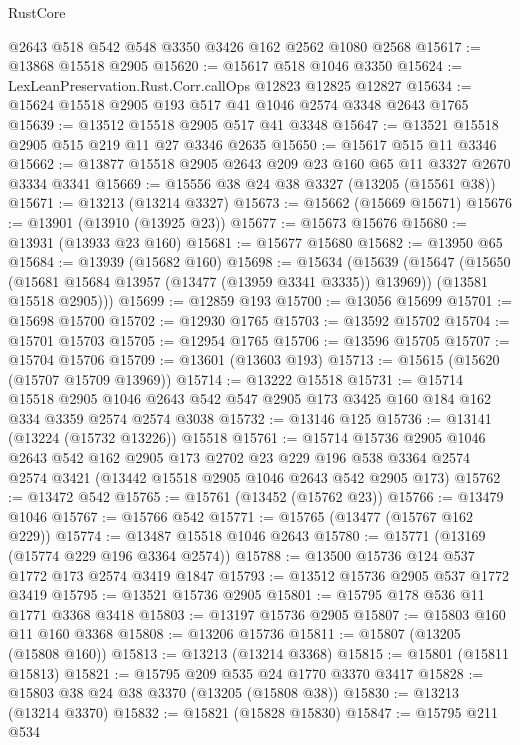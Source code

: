 \begin{lexlean}{RustCore}
\begin{coremodule}
    @2643
    @518
    @542
    @548
    @3350
    @3426
    @162
    @2562
    @1080
    @2568
@15617 := @13868 @15518 @2905
@15620 := @15617 @518 @1046 @3350
@15624 := LexLeanPreservation.Rust.Corr.callOps @12823 @12825 @12827
@15634 := @15624 @15518 @2905 @193 @517 @41 @1046 @2574 @3348 @2643 @1765
@15639 := @13512 @15518 @2905 @517 @41 @3348
@15647 := @13521 @15518 @2905 @515 @219 @11 @27 @3346 @2635
@15650 := @15617 @515 @11 @3346
@15662 := @13877 @15518 @2905 @2643 @209 @23 @160 @65 @11 @3327 @2670 @3334 @3341
@15669 := @15556 @38 @24 @38 @3327 (@13205 (@15561 @38))
@15671 := @13213 (@13214 @3327)
@15673 := @15662 (@15669 @15671)
@15676 := @13901 (@13910 (@13925 @23))
@15677 := @15673 @15676
@15680 := @13931 (@13933 @23 @160)
@15681 := @15677 @15680
@15682 := @13950 @65
@15684 := @13939 (@15682 @160)
@15698 := @15634
    (@15639
      (@15647
        (@15650 (@15681 @15684 @13957 (@13477 (@13959 @3341 @3335)) @13969))
        (@13581 @15518 @2905)))
@15699 := @12859 @193
@15700 := @13056 @15699
@15701 := @15698 @15700
@15702 := @12930 @1765
@15703 := @13592 @15702
@15704 := @15701 @15703
@15705 := @12954 @1765
@15706 := @13596 @15705
@15707 := @15704 @15706
@15709 := @13601 (@13603 @193)
@15713 := @15615 (@15620 (@15707 @15709 @13969))
@15714 := @13222 @15518
@15731 := @15714
    @15518
    @2905
    @1046
    @2643
    @542
    @547
    @2905
    @173
    @3425
    @160
    @184
    @162
    @334
    @3359
    @2574
    @2574
    @3038
@15732 := @13146 @125
@15736 := @13141 (@13224 (@15732 @13226)) @15518
@15761 := @15714
    @15736
    @2905
    @1046
    @2643
    @542
    @162
    @2905
    @173
    @2702
    @23
    @229
    @196
    @538
    @3364
    @2574
    @2574
    @3421
    (@13442 @15518 @2905 @1046 @2643 @542 @2905 @173)
@15762 := @13472 @542
@15765 := @15761 (@13452 (@15762 @23))
@15766 := @13479 @1046
@15767 := @15766 @542
@15771 := @15765 (@13477 (@15767 @162 @229))
@15774 := @13487 @15518 @1046 @2643
@15780 := @15771 (@13169 (@15774 @229 @196 @3364 @2574))
@15788 := @13500 @15736 @124 @537 @1772 @173 @2574 @3419 @1847
@15793 := @13512 @15736 @2905 @537 @1772 @3419
@15795 := @13521 @15736 @2905
@15801 := @15795 @178 @536 @11 @1771 @3368 @3418
@15803 := @13197 @15736 @2905
@15807 := @15803 @160 @11 @160 @3368
@15808 := @13206 @15736
@15811 := @15807 (@13205 (@15808 @160))
@15813 := @13213 (@13214 @3368)
@15815 := @15801 (@15811 @15813)
@15821 := @15795 @209 @535 @24 @1770 @3370 @3417
@15828 := @15803 @38 @24 @38 @3370 (@13205 (@15808 @38))
@15830 := @13213 (@13214 @3370)
@15832 := @15821 (@15828 @15830)
@15847 := @15795
    @211
    @534

\end{coremodule}
\end{lexlean}
